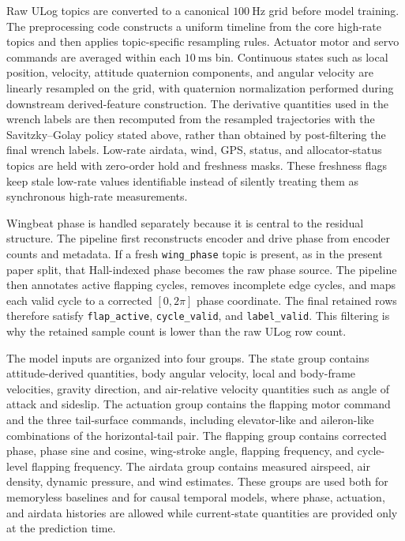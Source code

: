 Raw ULog topics are converted to a canonical $100~\mathrm{Hz}$ grid before model training. The preprocessing code constructs a uniform timeline from the core high-rate topics and then applies topic-specific resampling rules. Actuator motor and servo commands are averaged within each $10~\mathrm{ms}$ bin. Continuous states such as local position, velocity, attitude quaternion components, and angular velocity are linearly resampled on the grid, with quaternion normalization performed during downstream derived-feature construction. The derivative quantities used in the wrench labels are then recomputed from the resampled trajectories with the Savitzky--Golay policy stated above, rather than obtained by post-filtering the final wrench labels. Low-rate airdata, wind, GPS, status, and allocator-status topics are held with zero-order hold and freshness masks. These freshness flags keep stale low-rate values identifiable instead of silently treating them as synchronous high-rate measurements.

Wingbeat phase is handled separately because it is central to the residual structure. The pipeline first reconstructs encoder and drive phase from encoder counts and metadata. If a fresh \texttt{wing\_phase} topic is present, as in the present paper split, that Hall-indexed phase becomes the raw phase source. The pipeline then annotates active flapping cycles, removes incomplete edge cycles, and maps each valid cycle to a corrected $[0,2\pi]$ phase coordinate. The final retained rows therefore satisfy \texttt{flap\_active}, \texttt{cycle\_valid}, and \texttt{label\_valid}. This filtering is why the retained sample count is lower than the raw ULog row count.

The model inputs are organized into four groups. The state group contains attitude-derived quantities, body angular velocity, local and body-frame velocities, gravity direction, and air-relative velocity quantities such as angle of attack and sideslip. The actuation group contains the flapping motor command and the three tail-surface commands, including elevator-like and aileron-like combinations of the horizontal-tail pair. The flapping group contains corrected phase, phase sine and cosine, wing-stroke angle, flapping frequency, and cycle-level flapping frequency. The airdata group contains measured airspeed, air density, dynamic pressure, and wind estimates. These groups are used both for memoryless baselines and for causal temporal models, where phase, actuation, and airdata histories are allowed while current-state quantities are provided only at the prediction time.

